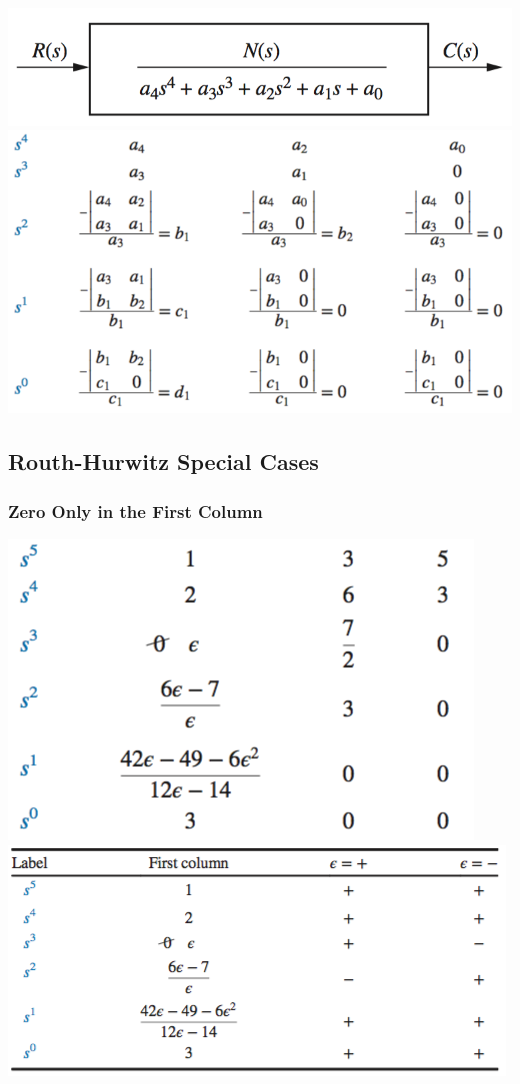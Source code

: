 \documentclass[11pt]{article}
\begin{document}
    \begin{center}
        \includegraphics[width=300 px]{img/routh-1}
        \includegraphics[width=300 px]{img/routh-2}
    \end{center}

    \subsection{Routh-Hurwitz Special Cases}

    \subsubsection{Zero Only in the First Column}

    \begin{center}
        \includegraphics[width=300 px]{img/routh-e}
        \includegraphics[width=300 px]{img/routh-e2}
    \end{center}
\end{document}
